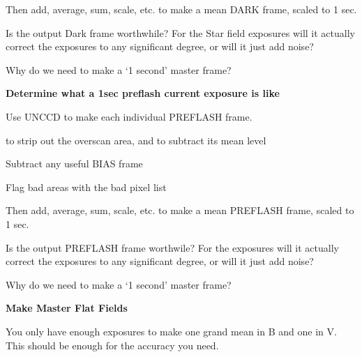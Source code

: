{{ Then add, average, sum, scale, etc. to make a mean DARK frame,
 scaled to 1 sec.
                                                                               
 Is the output Dark frame worthwhile? For the Star field exposures will
 it actually correct the exposures to any significant degree, or
 will it just add noise?
                                                                               
 Why do we need to make a `1 second' master frame?
                                                                               
                                                                               
{\hspace*{4ex} \bf   Determine what a 1sec preflash current exposure is like}
                                                                               
 Use UNCCD to make each individual PREFLASH frame.

\begin{list}{{-}}{}
\item to strip out the overscan area, and to subtract its mean level
\item Subtract any useful BIAS frame
\item Flag bad areas with the bad pixel list
\end{list}
                                                                               
 Then add, average, sum, scale, etc. to make a mean PREFLASH frame,
 scaled to 1 sec.
                                                                               
 Is the output PREFLASH frame worthwile? For the exposures will
 it actually correct the exposures to any significant degree, or
 will it just add noise?
                                                                               
 Why do we need to make a `1 second' master frame?
                                                                               
{\hspace*{4ex} \bf  Make Master Flat Fields}
                                                                               
 You only have enough exposures to make one grand mean in B and one
 in V. This should be enough for the accuracy you need.
                                                                               
}}
